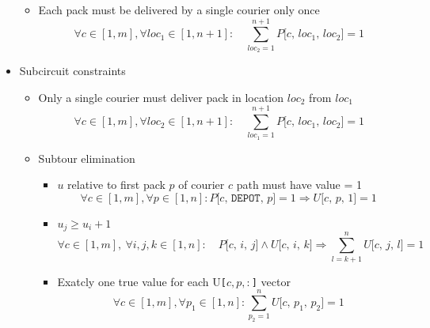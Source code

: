 \begin{itemize}
\begin{itemize}
        \item Each pack must be delivered by a single courier only once
        \begin{equation}
            \label{eq:gen_path_constr3}
            \forall c \in [1, m],
            \forall loc_1 \in [1, n+1]:
            \quad
            \sum_{loc_2=1}^{n+1} P\texttt{[$c$, $loc_1$, $loc_2$]} = 1
        \end{equation}
    \end{itemize}
    \item Subcircuit constraints
    \begin{itemize}
        \item Only a single courier must deliver pack in location $loc_2$ from $loc_1$
        \begin{equation}
            \label{eq:subtour_constr1}
            \forall c \in [1, m],
            \forall loc_2 \in [1, n+1]:
            \quad
            \sum_{loc_1=1}^{n+1} P\texttt{[$c$, $loc_1$, $loc_2$]} = 1
        \end{equation}
        \item Subtour elimination
        \begin{itemize}
            \item $u$ relative to first pack $p$ of courier $c$ path must have value = 1
            \begin{equation}
                \label{eq:subtour_constr2}
                \forall c \in [1, m],
                \forall p \in [1, n]:
                P\texttt{[$c$, DEPOT, $p$]}=1
                \Rightarrow
                U\texttt{[$c$, $p$, $1$]}=1
            \end{equation}
            \item $u_j \geq u_i + 1$
            \begin{equation}
                \label{eq:subtour_constr3}
                \forall c \in [1, m], \ \forall i, j, k \in [1, n]: \quad
                P\texttt{[$c$, $i$, $j$]} \land U\texttt{[$c$, $i$, $k$]} \Rightarrow
                \sum_{l=k+1}^{n} U\texttt{[$c$, $j$, $l$]} = 1
            \end{equation}
            
            \item Exatcly one true value for each U\texttt{[$c, p, :$]} vector
            \begin{equation}
                \label{eq:subtour_constr4}
                \forall c \in [1, m],
                \forall p_1 \in [1, n]:
                \sum_{p_2=1}^{n} U\texttt{[$c$, $p_1$, $p_2$]} = 1
            \end{equation}


\end{itemize}
\end{itemize}
\end{itemize}
